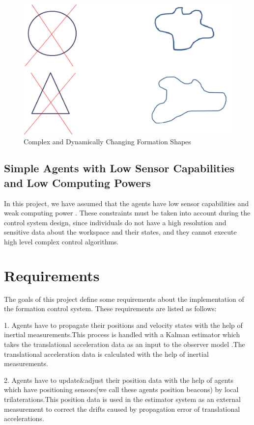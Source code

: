 \begin{figure}[H]
\caption{Complex and Dynamically Changing Formation Shapes}
\centering
\includegraphics[scale = 0.7]{complex}
\end{figure}

\subsection{Simple Agents with Low Sensor Capabilities and Low Computing Powers}
In this project, we have assumed that the agents have low sensor capabilities and weak computing power \cite{6}. These constraints must be taken into account during the control system design, since individuals do not have a high resolution and sensitive data about the workspace and their states, and they cannot execute high level complex control algorithms.

\section{Requirements}
The goals of this project define some requirements about the implementation of the formation control system. These requirements are listed as follows:

1. Agents have to propagate their positions and velocity states with the help of inertial measurements.This process is handled with a Kalman estimator which takes the translational acceleration data as an input to the observer model .The translational acceleration data is calculated with the help of inertial measurements. 

2. Agents have to update$\&$adjust their position data with the help of agents which have positioning sensors(we call these agents position beacons) by local trilaterations.This position data is used in the estimator system as an external measurement to correct the drifts caused by propagation error of translational accelerations.

